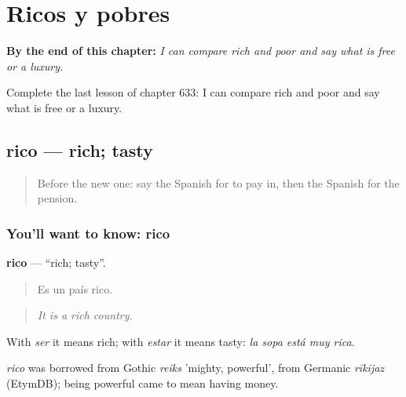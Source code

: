 
\chapter{Ricos y pobres}
\label{ch:es-ricos-y-pobres}

\begin{chapteropening}
\textbf{By the end of this chapter:} \emph{I can compare rich and poor and say what is free or a luxury.}

Complete the last lesson of chapter 633: I can compare rich and poor and say what is free or a luxury.
\end{chapteropening}

\section[rico]{rico — rich; tasty}

\label{lesson:ES-C633-rico}



\begin{quote}
Before the new one: say the Spanish for to pay in, then the Spanish for the pension.
\end{quote}

\subsection*{You'll want to know: rico}
\textbf{rico} — \textquotedblleft{}rich; tasty\textquotedblright{}.

\begin{quote}
Es un país rico.
\end{quote}

\begin{quote}
\emph{It is a rich country.}
\end{quote}

With \emph{ser} it means rich; with \emph{estar} it means tasty: \emph{la sopa está muy rica}.

\begin{cousinweb}
\emph{rico} was borrowed from Gothic \emph{reiks} 'mighty, powerful', from Germanic \emph{rīkijaz} (EtymDB); being powerful came to mean having money.
\end{cousinweb}

